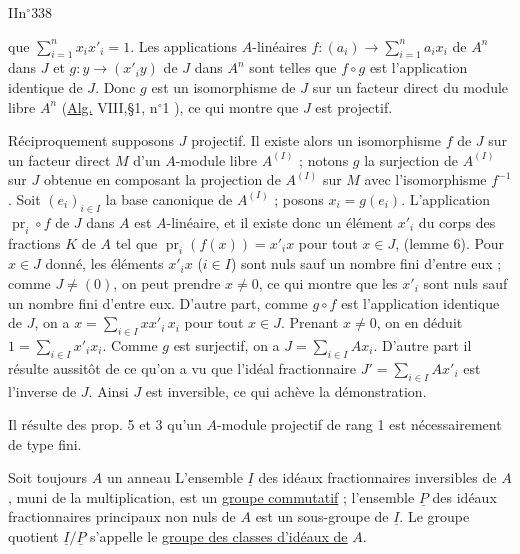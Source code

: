 

II\hfill{}\hfill n$^\circ$338

que $\displaystyle\sum_{i=1}^n x_ix'_i=1$. Les applications $A$-linéaires
$f:(a_i)\longrightarrow\displaystyle\sum_{i=1}^n a_ix_i$ de $A^n$
dans $J$ et $g:y\longrightarrow(x'_iy)$ de $J$ dans $A^n$ sont telles que
$f\circ g$ est l'application identique de $J$. Donc $g$ est un isomorphisme de $J$
sur un facteur direct du module libre $A^n$ (\uline{Alg.} VIII,\S1, n$^\circ$1 ), ce qui montre que $J$ est projectif.

Réciproquement supposons $J$ projectif. Il existe alors un isomorphisme $f$
de $J$ sur un facteur direct $M$ d'un $A$-module libre $A^{(I)}$ ; notons $g$ la surjection
de $A^{(I)}$ sur $J$ obtenue en composant la projection de $A^{(I)}$ sur $M$ avec
l'isomorphisme $f^{-1}$. Soit $(e_i)_{i\in I}$ la base canonique de $A^{(I)}$ ; posons
$x_i=g(e_i)$. L'application $\operatorname{pr}_i\circ f$ de $J$ dans $A$ est $A$-linéaire, et il existe
donc un élément $x'_i$ du corps des fractions $K$ de $A$ tel que $\operatorname{pr}_i(f(x))=x'_ix$
pour tout $x\in J$, (lemme 6). Pour $x\in J$ donné, les éléments $x'_ix$ ($i\in I$) sont
nuls sauf un nombre fini d'entre eux ; comme $J\ne(0)$, on peut prendre $x\ne0$,
ce qui montre que les $x'_i$ sont nuls sauf un nombre fini d'entre eux. D'autre
part, comme $g\circ f$ est l'application identique de $J$, on a
$x=\displaystyle\sum_{i\in I}xx'_i\,x_i$ pour
tout $x\in J$. Prenant $x\ne0$, on en déduit $1=\displaystyle\sum_{i\in I}x'_ix_i$.
Comme $g$ est surjectif, on a $J=\displaystyle\sum_{i\in I}Ax_i$.
D'autre part il résulte aussitôt de ce qu'on a vu
que l'idéal fractionnaire $J'=\displaystyle\sum_{i\in I}Ax'_i$ est l'inverse de $J$.
Ainsi $J$ est inversible, ce qui achève la démonstration.

Il résulte des prop. 5 et 3 qu'un $A$-module projectif de rang 1 est
nécessairement de type fini.

Soit toujours $A$ un anneau
L'ensemble $\underline I$ des idéaux fractionnaires
inversibles de $A$, muni de la multiplication, est un \uline{groupe commutatif} ;
l'ensemble $\underline P$ des idéaux fractionnaires principaux non nuls de $A$ est un sous-groupe
de $\underline I$. Le groupe quotient $\underline I/\underline P$ s'appelle le \uline{groupe des classes d'idéaux
de} $A$.

